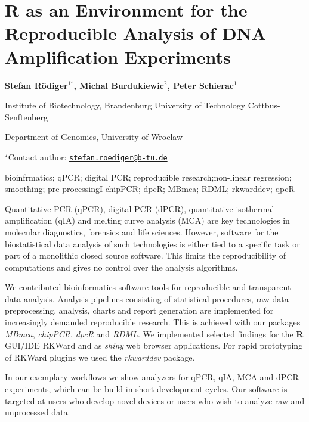 \documentclass[\main/boa.tex]{subfiles}
\begin{document}
\section{R as an Environment for the Reproducible Analysis of DNA Amplification
Experiments}

\begin{center}
  {\bf Stefan Rödiger$^{1^\star}$, Michal Burdukiewic$^{2}$, Peter Schierac$^{1}$}
\end{center}

\vskip 0.3cm

\begin{affiliations}
\begin{enumerate}
\begin{minipage}{0.915\textwidth}
\centering
\item Institute of Biotechnology, Brandenburg University of Technology
Cottbus-Senftenberg \\[-2pt]
\item Department of Genomics, University of Wroclaw \\[-2pt]
\end{minipage}
\end{enumerate}
$^\star$Contact author: \href{mailto:stefan.roediger@b-tu.de}{\nolinkurl{stefan.roediger@b-tu.de}}\\
\end{affiliations}

\vskip 0.5cm

\begin{minipage}{0.915\textwidth}
\keywords bioinfrmatics; qPCR; digital PCR; reproducible research;non-linear
regression; smoothing; pre-processingI
\packages chipPCR; dpcR; MBmca; RDML; rkwarddev; qpcR
\end{minipage}

\vskip 0.8cm

Quantitative PCR (qPCR), digital PCR (dPCR), quantitative isothermal
amplification (qIA) and melting curve analysis (MCA) are key
technologies in molecular diagnostics, forensics and life sciences.
However, software for the biostatistical data analysis of such
technologies is either tied to a specific task or part of a monolithic
closed source software. This limits the reproducibility of computations
and gives no control over the analysis algorithms.

We contributed bioinformatics software tools for reproducible and
transparent data analysis. Analysis pipelines consisting of statistical
procedures, raw data preprocessing, analysis, charts and report
generation are implemented for increasingly demanded reproducible
research. This is achieved with our packages \emph{MBmca},
\emph{chipPCR}, \emph{dpcR} and \emph{RDML}. We implemented selected
findings for the \textbf{R} GUI/IDE RKWard and as \emph{shiny} web
browser applications. For rapid prototyping of RKWard plugins we used
the \emph{rkwarddev} package.

In our exemplary workflows we show analyzers for qPCR, qIA, MCA and dPCR
experiments, which can be build in short development cycles. Our
software is targeted at users who develop novel devices or users who
wish to analyze raw and unprocessed data.
\end{document}
